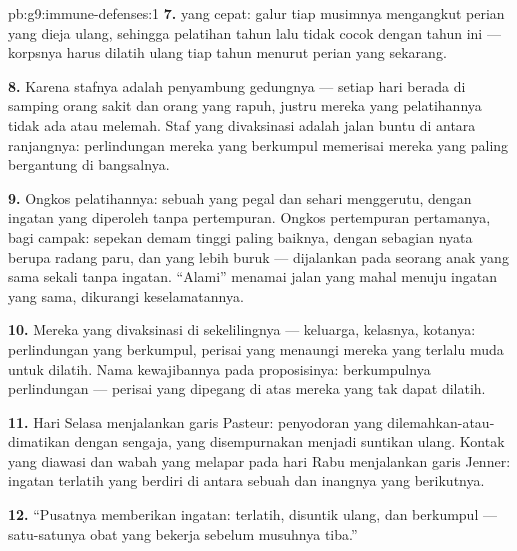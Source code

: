 \begin{solution}{pb:g9:immune-defenses:1}
\textbf{7.}  yang cepat: galur tiap musimnya
mengangkut perian yang dieja ulang, sehingga pelatihan tahun
lalu tidak cocok dengan  tahun ini --- korpsnya harus
dilatih ulang tiap tahun menurut perian yang sekarang.

\textbf{8.} Karena stafnya adalah penyambung gedungnya ---
setiap hari berada di samping orang sakit dan orang yang
rapuh, justru mereka yang pelatihannya tidak ada atau
melemah. Staf yang divaksinasi adalah jalan buntu di antara
ranjangnya: perlindungan mereka yang berkumpul memerisai
mereka yang paling bergantung di bangsalnya.

\textbf{9.} Ongkos pelatihannya: sebuah  yang pegal
dan sehari menggerutu, dengan ingatan yang diperoleh tanpa
pertempuran. Ongkos pertempuran pertamanya, bagi campak:
sepekan demam tinggi paling baiknya, dengan sebagian nyata
berupa radang paru, dan yang lebih buruk --- dijalankan pada
seorang anak yang sama sekali tanpa ingatan. ``Alami''
menamai jalan yang mahal menuju ingatan yang sama, dikurangi
keselamatannya.

\textbf{10.} Mereka yang divaksinasi di sekelilingnya ---
keluarga, kelasnya, kotanya: perlindungan yang berkumpul,
perisai yang menaungi mereka yang terlalu muda untuk
dilatih. Nama kewajibannya pada proposisinya: berkumpulnya
perlindungan --- perisai yang dipegang di atas mereka yang
tak dapat dilatih.

\textbf{11.} Hari Selasa menjalankan garis Pasteur:
penyodoran yang dilemahkan-atau-dimatikan dengan sengaja,
yang disempurnakan menjadi suntikan ulang. Kontak yang
diawasi dan wabah yang melapar pada hari Rabu menjalankan
garis Jenner: ingatan terlatih yang berdiri di antara sebuah
 dan inangnya yang berikutnya.

\textbf{12.} ``Pusatnya memberikan ingatan: terlatih,
disuntik ulang, dan berkumpul --- satu-satunya obat yang
bekerja sebelum musuhnya tiba.''
\end{solution}
